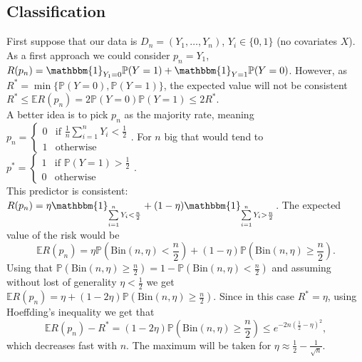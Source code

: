 \documentclass[11pt, english]{article}
\begin{document}
\subsection{Classification}

First suppose that our data is $D_n=(Y_1,\dots,Y_n)$, $Y_i\in\{0,1\}$ (no covariates $X$).\\

As a first approach we could consider $p_n=Y_1$, $R(p_n)=\mathbbm{1}_{Y_1=0}\mathbb{P}(Y=1)+\mathbbm{1}_{Y=1}\mathbb{P}(Y=0)$. However, as $R^*=\min\{\mathbb{P}(Y=0),\mathbb{P}(Y=1)\}$, the expected value will not be consistent $R^*\leq\mathbb{E}R(p_n)=2\mathbb{P}(Y=0)\mathbb{P}(Y=1)\leq 2R^*$.\\

A better idea is to pick $p_n$ as the majority rate, meaning $p_n=\left\{\begin{array}{ll}
0 & \text{if }\frac{1}{n}\sum\limits_{i=1}^nY_i<\frac{1}{2}\\
1 & \text{otherwise}
\end{array}\right.$. For $n$ big that would tend to $p^*=\left\{\begin{array}{ll}
1 & \text{if }\mathbb{P}(Y=1)>\frac{1}{2}\\
0 & \text{otherwise}\end{array}\right.$. \\
This predictor is consistent: $R(p_n)=\eta\mathbbm{1}_{\sum\limits_{i=1}^nY_i<\frac{n}{2}}+(1-\eta)\mathbbm{1}_{\sum\limits_{i=1}^nY_i>\frac{n}{2}}$. The expected value  of the risk would be
\begin{equation}
	\mathbb{E}R(p_n)=\eta\mathbb{P}(\text{Bin}(n,\eta)<\frac{n}{2})+(1-\eta)\mathbb{P}(\text{Bin}(n,\eta)\geq\frac{n}{2}).
\end{equation}
Using that $\mathbb{P}(\text{Bin}(n,\eta)\geq\frac{n}{2})=1-\mathbb{P}(\text{Bin}(n,\eta)<\frac{n}{2})$ and assuming without lost of generality $\eta<\frac{1}{2}$ we get $\mathbb{E}R(p_n)=\eta+(1-2\eta)\mathbb{P}(\text{Bin}(n,\eta)\geq\frac{n}{2})$. Since in this case $R^*=\eta$, using Hoeffding's inequality we get that 
\begin{equation}
	\mathbb{E}R(p_n)-R^*=(1-2\eta)\mathbb{P}(\text{Bin}(n,\eta)\geq\frac{n}{2})\leq e^{-2n(\frac{1}{2}-\eta)^2},
\end{equation}
which decreases fast with $n$. The maximum will be taken for $\eta\approx \frac{1}{2}-\frac{1}{\sqrt{n}}$.
\end{document}
